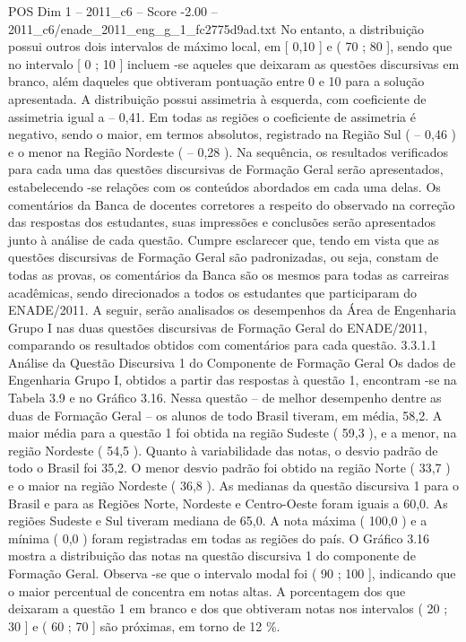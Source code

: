 \begin{textsample}{POS Dim 1 – 2011\_c6 – Score -2.00 – 2011\_c6/enade\_2011\_eng\_g\_1\_fc2775d9ad.txt}
No entanto, a distribuição possui outros dois intervalos de máximo local, em [ 0,10 ] e ( 70 ; 80 ], sendo que no intervalo [ 0 ; 10 ] incluem -se aqueles que deixaram as questões discursivas em branco, além daqueles que obtiveram pontuação entre 0 e 10 para a solução apresentada.
A distribuição possui assimetria à esquerda, com coeficiente de assimetria igual a – 0,41.
Em todas as regiões o coeficiente de assimetria é negativo, sendo o maior, em termos absolutos, registrado na Região Sul ( – 0,46 ) e o menor na Região Nordeste ( – 0,28 ).
Na sequência, os resultados verificados para cada uma das questões discursivas de Formação Geral serão apresentados, estabelecendo -se relações com os conteúdos abordados em cada uma delas.
Os comentários da Banca de docentes corretores a respeito do observado na correção das respostas dos estudantes, suas impressões e conclusões serão apresentados junto à análise de cada questão.
Cumpre esclarecer que, tendo em vista que as questões discursivas de Formação Geral são padronizadas, ou seja, constam de todas as provas, os comentários da Banca são os mesmos para todas as carreiras acadêmicas, sendo direcionados a todos os estudantes que participaram do ENADE/2011.
A seguir, serão analisados os desempenhos da Área de Engenharia Grupo I nas duas questões discursivas de Formação Geral do ENADE/2011, comparando os resultados obtidos com comentários para cada questão. 3.3.1.1 Análise da Questão Discursiva 1 do Componente de Formação Geral Os dados de Engenharia Grupo I, obtidos a partir das respostas à questão 1, encontram -se na Tabela 3.9 e no Gráfico 3.16.
Nessa questão – de melhor desempenho dentre as duas de Formação Geral – os alunos de todo Brasil tiveram, em média, 58,2.
A maior média para a questão 1 foi obtida na região Sudeste ( 59,3 ), e a menor, na região Nordeste ( 54,5 ).
Quanto à variabilidade das notas, o desvio padrão de todo o Brasil foi 35,2.
O menor desvio padrão foi obtido na região Norte ( 33,7 ) e o maior na região Nordeste ( 36,8 ).
As medianas da questão discursiva 1 para o Brasil e para as Regiões Norte, Nordeste e Centro-Oeste foram iguais a 60,0.
As regiões Sudeste e Sul tiveram mediana de 65,0.
A nota máxima ( 100,0 ) e a mínima ( 0,0 ) foram registradas em todas as regiões do país.
O Gráfico 3.16 mostra a distribuição das notas na questão discursiva 1 do componente de Formação Geral.
Observa -se que o intervalo modal foi ( 90 ; 100 ], indicando que o maior percentual de concentra em notas altas.
A porcentagem dos que deixaram a questão 1 em branco e dos que obtiveram notas nos intervalos ( 20 ; 30 ] e ( 60 ; 70 ] são próximas, em torno de 12 \%.

\end{textsample}
